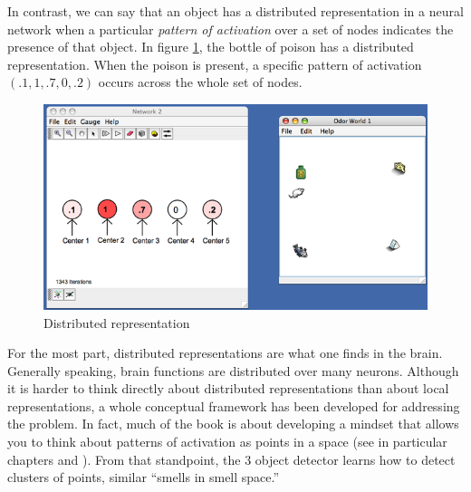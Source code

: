 In contrast, we can say that an object has a distributed representation in a neural network when a particular {\em pattern of activation} over a set of nodes indicates the presence of that object. In figure \ref{distributed},  the bottle of poison has a distributed representation. When the poison is present, a specific pattern of activation $(.1,1,.7,0,.2)$ occurs across the whole set of nodes.

\begin{figure}[h]
\centering
\includegraphics[scale=.3]{./images/Distributed_Rep.png}
\caption{Distributed representation}
\label{distributed}
\end{figure}

For the most part, distributed representations are what one finds in the brain. Generally speaking, brain functions are distributed over many neurons. Although it is harder to think directly about distributed representations than about local representations, a whole conceptual framework has been developed for addressing the problem. In fact, much of the book is about developing a mindset that allows you to think about patterns of activation as points in a space (see in particular chapters  and ).  From that standpoint, the 3 object detector learns how to detect clusters of points, similar ``smells in smell space.'' 
